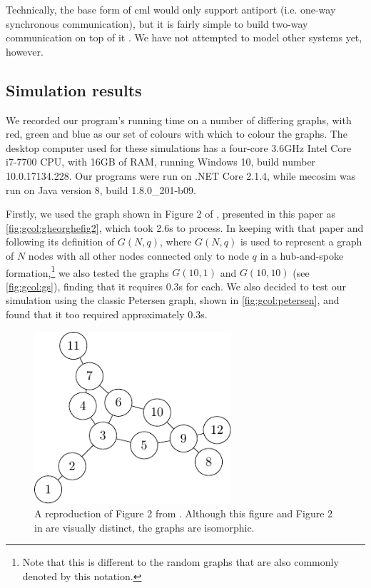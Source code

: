 Technically, the base form of \gls{cml} would only support antiport (i.e. one-way synchronous communication), but it is fairly simple to build two-way communication on top of it \cite[ch.~6]{Reppy2007}.  We have not attempted to model other systems yet, however.

\subsection{Simulation results}
We recorded our program's running time on a number of differing graphs, with red, green and blue as our set of colours with which to colour the graphs.  The desktop computer used for these simulations has a four-core 3.6GHz Intel Core i7-7700 CPU, with 16GB of RAM, running Windows 10, build number 10.0.17134.228.  Our \fsharp{} programs were run on .NET Core 2.1.4, while \gls{mecosim} was run on Java version 8, build 1.8.0\_201-b09.

Firstly, we used the graph shown in Figure 2 of \cite{Gheorghe2013}, presented in this paper as \autoref{fig:gcol:gheorghefig2}, which took 2.6s to process.  In keeping with that paper and following its definition of \(G(N,q)\), where \(G(N,q)\) is used to represent a graph of \(N\) nodes with all other nodes connected only to node \(q\) in a hub-and-spoke formation,\footnote{Note that this is different to the random graphs that are also commonly denoted by this notation.} we also tested the graphs \(G(10,1)\) and \(G(10,10)\) (see \autoref{fig:gcol:gs}), finding that it requires 0.3s for each.  We also decided to test our simulation using the classic Petersen graph, shown in \autoref{fig:gcol:petersen}, and found that it too required approximately 0.3s.

\begin{figure}
    \centering
    \includegraphics[width=0.65\textwidth]{chapters/gcol/figs/gheorghe-figure-2-figure0.pdf}
    \caption{\label{fig:gcol:gheorghefig2}A reproduction of Figure 2 from \cite{Gheorghe2013}.  Although this figure and Figure 2 in \cite{Gheorghe2013} are visually distinct, the graphs are isomorphic.}
\end{figure}

